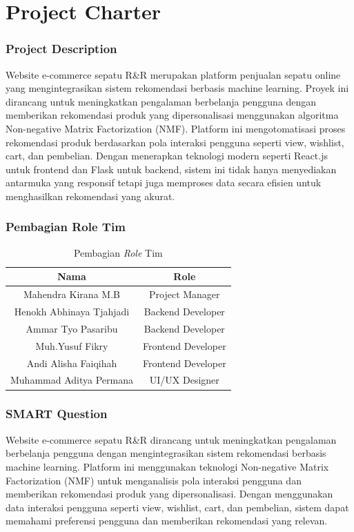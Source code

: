 \documentclass[journal,article,submit,pdftex,moreauthors]{Definitions/mdpi}
\begin{document}


\section{Project Charter}

\subsubsection{Project Description}
Website e-commerce sepatu R\&R merupakan platform penjualan sepatu online yang mengintegrasikan sistem rekomendasi berbasis machine learning. Proyek ini dirancang untuk meningkatkan pengalaman berbelanja pengguna dengan memberikan rekomendasi produk yang dipersonalisasi menggunakan algoritma Non-negative Matrix Factorization (NMF). Platform ini mengotomatisasi proses rekomendasi produk berdasarkan pola interaksi pengguna seperti view, wishlist, cart, dan pembelian. Dengan menerapkan teknologi modern seperti React.js untuk frontend dan Flask untuk backend, sistem ini tidak hanya menyediakan antarmuka yang responsif tetapi juga memproses data secara efisien untuk menghasilkan rekomendasi yang akurat.
\subsubsection{Pembagian Role Tim}
\begin{table}[ht]
\centering
\begin{tabular}{|c|c|}
\hline
\textbf{Nama} & \textbf{Role} \\
\hline
Mahendra Kirana M.B & Project Manager \\
Henokh Abhinaya Tjahjadi & Backend Developer \\
Ammar Tyo Pasaribu & Backend Developer \\
Muh.Yusuf Fikry & Frontend Developer \\
Andi Alisha Faiqihah & Frontend Developer \\
Muhammad Aditya Permana & UI/UX Designer  \\
\hline
\end{tabular}
\captionsetup{justification=centering}
\caption{Pembagian \textit{Role} Tim}
\end{table}


\subsubsection{SMART Question}
Website e-commerce sepatu R\&R dirancang untuk meningkatkan pengalaman berbelanja pengguna dengan mengintegrasikan sistem rekomendasi berbasis machine learning. Platform ini menggunakan teknologi Non-negative Matrix Factorization (NMF) untuk menganalisis pola interaksi pengguna dan memberikan rekomendasi produk yang dipersonalisasi. Dengan menggunakan data interaksi pengguna seperti view, wishlist, cart, dan pembelian, sistem dapat memahami preferensi pengguna dan memberikan rekomendasi yang relevan.
\end{document}
